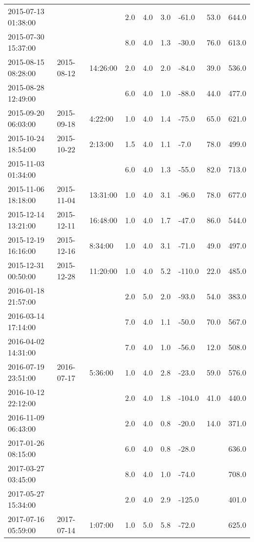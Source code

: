 \begin{longtable}{lllllllll}
        2015-07-13 01:38:00 & ~ & ~ & 2.0 & 4.0 & 3.0 & -61.0 & 53.0 & 644.0 \\ 
        2015-07-30 15:37:00 & ~ & ~ & 8.0 & 4.0 & 1.3 & -30.0 & 76.0 & 613.0 \\ 
        2015-08-15 08:28:00 & 2015-08-12 & 14:26:00 & 2.0 & 4.0 & 2.0 & -84.0 & 39.0 & 536.0 \\ 
        2015-08-28 12:49:00 & ~ & ~ & 6.0 & 4.0 & 1.0 & -88.0 & 44.0 & 477.0 \\ 
        2015-09-20 06:03:00 & 2015-09-18 & 4:22:00 & 1.0 & 4.0 & 1.4 & -75.0 & 65.0 & 621.0 \\ 
        2015-10-24 18:54:00 & 2015-10-22 & 2:13:00 & 1.5 & 4.0 & 1.1 & -7.0 & 78.0 & 499.0 \\ 
        2015-11-03 01:34:00 & ~ & ~ & 6.0 & 4.0 & 1.3 & -55.0 & 82.0 & 713.0 \\ 
        2015-11-06 18:18:00 & 2015-11-04 & 13:31:00 & 1.0 & 4.0 & 3.1 & -96.0 & 78.0 & 677.0 \\ 
        2015-12-14 13:21:00 & 2015-12-11 & 16:48:00 & 1.0 & 4.0 & 1.7 & -47.0 & 86.0 & 544.0 \\ 
        2015-12-19 16:16:00 & 2015-12-16 & 8:34:00 & 1.0 & 4.0 & 3.1 & -71.0 & 49.0 & 497.0 \\ 
        2015-12-31 00:50:00 & 2015-12-28 & 11:20:00 & 1.0 & 4.0 & 5.2 & -110.0 & 22.0 & 485.0 \\ 
        2016-01-18 21:57:00 & ~ & ~ & 2.0 & 5.0 & 2.0 & -93.0 & 54.0 & 383.0 \\ 
        2016-03-14 17:14:00 & ~ & ~ & 7.0 & 4.0 & 1.1 & -50.0 & 70.0 & 567.0 \\ 
        2016-04-02 14:31:00 & ~ & ~ & 7.0 & 4.0 & 1.0 & -56.0 & 12.0 & 508.0 \\ 
        2016-07-19 23:51:00 & 2016-07-17 & 5:36:00 & 1.0 & 4.0 & 2.8 & -23.0 & 59.0 & 576.0 \\ 
        2016-10-12 22:12:00 & ~ & ~ & 2.0 & 4.0 & 1.8 & -104.0 & 41.0 & 440.0 \\ 
        2016-11-09 06:43:00 & ~ & ~ & 2.0 & 4.0 & 0.8 & -20.0 & 14.0 & 371.0 \\ 
        2017-01-26 08:15:00 & ~ & ~ & 6.0 & 4.0 & 0.8 & -28.0 & ~ & 636.0 \\ 
        2017-03-27 03:45:00 & ~ & ~ & 8.0 & 4.0 & 1.0 & -74.0 & ~ & 708.0 \\ 
        2017-05-27 15:34:00 & ~ & ~ & 2.0 & 4.0 & 2.9 & -125.0 & ~ & 401.0 \\ 
        2017-07-16 05:59:00 & 2017-07-14 & 1:07:00 & 1.0 & 5.0 & 5.8 & -72.0 & ~ & 625.0 \\ 

\end{longtable}

